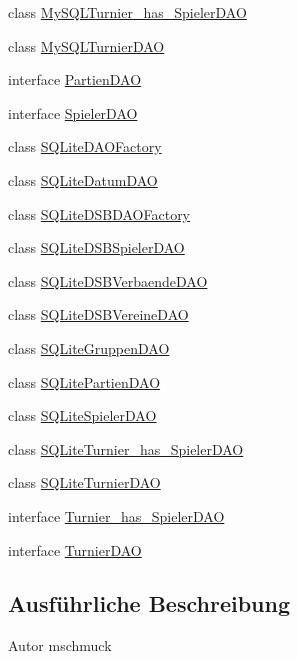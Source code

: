 \begin{DoxyCompactItemize}
\item 
class \hyperlink{classde_1_1turnierverwaltung_1_1mysql_1_1_my_s_q_l_turnier__has___spieler_d_a_o}{My\+S\+Q\+L\+Turnier\+\_\+has\+\_\+\+Spieler\+D\+AO}
\item 
class \hyperlink{classde_1_1turnierverwaltung_1_1mysql_1_1_my_s_q_l_turnier_d_a_o}{My\+S\+Q\+L\+Turnier\+D\+AO}
\item 
interface \hyperlink{interfacede_1_1turnierverwaltung_1_1mysql_1_1_partien_d_a_o}{Partien\+D\+AO}
\item 
interface \hyperlink{interfacede_1_1turnierverwaltung_1_1mysql_1_1_spieler_d_a_o}{Spieler\+D\+AO}
\item 
class \hyperlink{classde_1_1turnierverwaltung_1_1mysql_1_1_s_q_lite_d_a_o_factory}{S\+Q\+Lite\+D\+A\+O\+Factory}
\item 
class \hyperlink{classde_1_1turnierverwaltung_1_1mysql_1_1_s_q_lite_datum_d_a_o}{S\+Q\+Lite\+Datum\+D\+AO}
\item 
class \hyperlink{classde_1_1turnierverwaltung_1_1mysql_1_1_s_q_lite_d_s_b_d_a_o_factory}{S\+Q\+Lite\+D\+S\+B\+D\+A\+O\+Factory}
\item 
class \hyperlink{classde_1_1turnierverwaltung_1_1mysql_1_1_s_q_lite_d_s_b_spieler_d_a_o}{S\+Q\+Lite\+D\+S\+B\+Spieler\+D\+AO}
\item 
class \hyperlink{classde_1_1turnierverwaltung_1_1mysql_1_1_s_q_lite_d_s_b_verbaende_d_a_o}{S\+Q\+Lite\+D\+S\+B\+Verbaende\+D\+AO}
\item 
class \hyperlink{classde_1_1turnierverwaltung_1_1mysql_1_1_s_q_lite_d_s_b_vereine_d_a_o}{S\+Q\+Lite\+D\+S\+B\+Vereine\+D\+AO}
\item 
class \hyperlink{classde_1_1turnierverwaltung_1_1mysql_1_1_s_q_lite_gruppen_d_a_o}{S\+Q\+Lite\+Gruppen\+D\+AO}
\item 
class \hyperlink{classde_1_1turnierverwaltung_1_1mysql_1_1_s_q_lite_partien_d_a_o}{S\+Q\+Lite\+Partien\+D\+AO}
\item 
class \hyperlink{classde_1_1turnierverwaltung_1_1mysql_1_1_s_q_lite_spieler_d_a_o}{S\+Q\+Lite\+Spieler\+D\+AO}
\item 
class \hyperlink{classde_1_1turnierverwaltung_1_1mysql_1_1_s_q_lite_turnier__has___spieler_d_a_o}{S\+Q\+Lite\+Turnier\+\_\+has\+\_\+\+Spieler\+D\+AO}
\item 
class \hyperlink{classde_1_1turnierverwaltung_1_1mysql_1_1_s_q_lite_turnier_d_a_o}{S\+Q\+Lite\+Turnier\+D\+AO}
\item 
interface \hyperlink{interfacede_1_1turnierverwaltung_1_1mysql_1_1_turnier__has___spieler_d_a_o}{Turnier\+\_\+has\+\_\+\+Spieler\+D\+AO}
\item 
interface \hyperlink{interfacede_1_1turnierverwaltung_1_1mysql_1_1_turnier_d_a_o}{Turnier\+D\+AO}
\end{DoxyCompactItemize}


\subsection{Ausführliche Beschreibung}
\begin{DoxyAuthor}{Autor}
mschmuck 
\end{DoxyAuthor}
